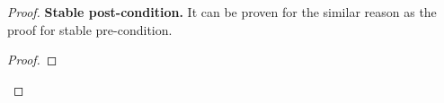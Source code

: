 \begin{proof}
\textbf{Stable post-condition.} 
It can be proven for the similar reason as the proof for stable pre-condition.

\begin{thm}
\end{thm}
\begin{proof}
\end{proof}

\end{proof}
